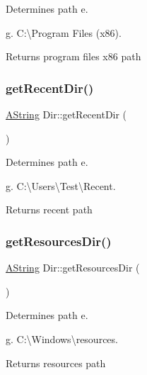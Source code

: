 Determines path e. 

g. C\+:\textbackslash{}\+Program Files (x86). \begin{DoxyReturn}{Returns}
program files x86 path 
\end{DoxyReturn}
\mbox{\label{class_dir_ae1d13db09743697eaa742c338fbdb36a}} 
\subsubsection{\texorpdfstring{getRecentDir()}{getRecentDir()}}
{\footnotesize\ttfamily \mbox{\hyperlink{class_a_string}{A\+String}} Dir\+::get\+Recent\+Dir (\begin{DoxyParamCaption}{ }\end{DoxyParamCaption})\hspace{0.3cm}{\ttfamily [static]}}



Determines path e. 

g. C\+:\textbackslash{}\+Users\textbackslash{}\+Test\textbackslash{}\+Recent. \begin{DoxyReturn}{Returns}
recent path 
\end{DoxyReturn}
\mbox{\label{class_dir_afe62412853426883149a3040980d6edd}} 
\subsubsection{\texorpdfstring{getResourcesDir()}{getResourcesDir()}}
{\footnotesize\ttfamily \mbox{\hyperlink{class_a_string}{A\+String}} Dir\+::get\+Resources\+Dir (\begin{DoxyParamCaption}{ }\end{DoxyParamCaption})\hspace{0.3cm}{\ttfamily [static]}}



Determines path e. 

g. C\+:\textbackslash{}\+Windows\textbackslash{}resources. \begin{DoxyReturn}{Returns}
resources path 
\end{DoxyReturn}
\mbox{\label{class_dir_af4da4485967970856d4691dc9eba0f00}} 
